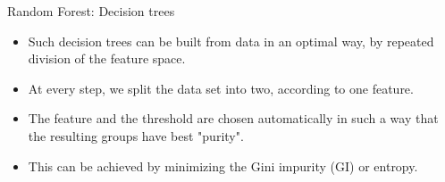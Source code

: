 \documentclass[xcolor=pdftex,dvipsnames,table]{beamer}
\begin{document}
\begin{frame}{Random Forest: Decision trees}
\begin{itemize}
\item Such decision trees can be built from data in an optimal way, by repeated division of the feature space.
\item At every step, we split the data set into two, according to one feature.
\item The feature and the threshold are chosen automatically in such a way that the resulting groups have best "purity".
\item This can be achieved by minimizing the Gini impurity (GI) or entropy. 
\end{itemize}
\end{frame}

\end{document}
